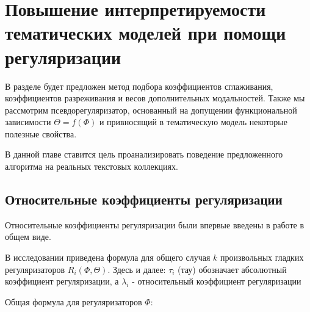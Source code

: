 \chapter{Повышение интерпретируемости тематических моделей при помощи регуляризации} 

 

В разделе будет предложен метод подбора коэффициентов сглаживания, коэффициентов разреживания и весов дополнительных модальностей. Также мы рассмотрим псевдорегуляризатор, основанный на допущении функциональной зависимости $\Theta = f(\Phi)$ и привносящий в тематическую модель некоторые полезные свойства. 

 

В данной главе ставится цель проанализировать поведение предложенного алгоритма на реальных текстовых коллекциях. 

 

\section{Относительные коэффициенты регуляризации} 

 


 


 

Относительные коэффициенты регуляризации были впервые введены в работе \cite{doykov} в общем виде. 

 


В исследовании \cite{doykov} приведена формула для общего случая $k$ произвольных гладких регуляризаторов $R_i(\Phi, \Theta)$. Здесь и далее: $\tau_i$ (тау) обозначает абсолютный коэффициент регуляризации, а $\lambda_i$ - относительный коэффициент регуляризации 

 

Общая формула для регуляризаторов $\Phi$: 

